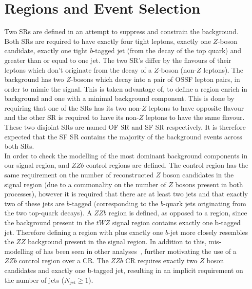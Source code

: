 \section{Regions and Event Selection}
\label{sec:regionsAndEventSelection}

Two \tWZ SRs are defined in an attempt to suppress and constrain the \ZZ background. Both \tWZ SRs are required to have exactly four tight leptons, exactly one $Z$-boson candidate, exactly one tight $b$-tagged jet (from the decay of the top quark) and greater than or equal to one jet. The two \tWZ SR's differ by the flavours of their leptons which don't originate from the decay of a $Z$-boson (non-$Z$ leptons). The \ZZ background has two $Z$-bosons which decay into a pair of OSSF lepton pairs, in order to mimic the \tWZ signal. This is taken advantage of, to define a \tWZ region enrich in \ZZ background and one with a minimal \ZZ background component. This is done by requiring that one of the \tWZ SRs has its two non-$Z$ leptons to have opposite flavour and the other \tWZ SR is required to have its non-$Z$ leptons to have the same flavour. These two disjoint \tWZ SRs are named \tWZ OF SR and \tWZ SF SR respectively. It is  therefore expected that the \tWZ SF SR contains the majority of the \ZZ background events across both \tWZ SRs. \\

In order to check the modelling of the most dominant background components in our signal region, \ttZ and $ZZb$ control regions are defined. The \ttZ control region has the same requirement on the number of reconstructed $Z$ boson candidates in the signal region (due to a commonality on the number of $Z$ bosons present in both processes), however it is required that there are at least two jets and that exactly two of these jets are $b$-tagged (corresponding to the $b$-quark jets originating from the two top-quark decays). A $ZZb$ region is defined, as opposed to a \ZZ region, since the \ZZ background present in the $tWZ$ signal region contains exactly one b-tagged jet. Therefore defining a region with \ZZ plus exactly one $b$-jet more closely resembles the $ZZ$ background present in the signal region. In addition to this, mis-modelling of \ZZ has been seen in other analyses~\cite{Aaboud:2019, ppToZZ:CMSpaper}, further motivating the use of a $ZZb$ control region over a \ZZ CR. The $ZZb$ CR requires exactly two $Z$ boson candidates and exactly one b-tagged jet, resulting in an implicit requirement on the number of jets ($N_{jet} \geq 1$).\\

